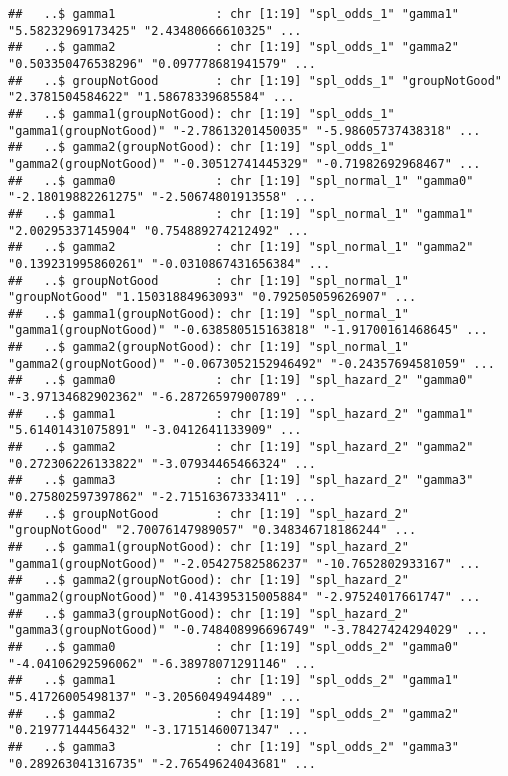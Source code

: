 \documentclass[
]{article}
\begin{document}
\begin{verbatim}
##   ..$ gamma1              : chr [1:19] "spl_odds_1" "gamma1" "5.58232969173425" "2.43480666610325" ...
##   ..$ gamma2              : chr [1:19] "spl_odds_1" "gamma2" "0.503350476538296" "0.097778681941579" ...
##   ..$ groupNotGood        : chr [1:19] "spl_odds_1" "groupNotGood" "2.3781504584622" "1.58678339685584" ...
##   ..$ gamma1(groupNotGood): chr [1:19] "spl_odds_1" "gamma1(groupNotGood)" "-2.78613201450035" "-5.98605737438318" ...
##   ..$ gamma2(groupNotGood): chr [1:19] "spl_odds_1" "gamma2(groupNotGood)" "-0.30512741445329" "-0.71982692968467" ...
##   ..$ gamma0              : chr [1:19] "spl_normal_1" "gamma0" "-2.18019882261275" "-2.50674801913558" ...
##   ..$ gamma1              : chr [1:19] "spl_normal_1" "gamma1" "2.00295337145904" "0.754889274212492" ...
##   ..$ gamma2              : chr [1:19] "spl_normal_1" "gamma2" "0.139231995860261" "-0.0310867431656384" ...
##   ..$ groupNotGood        : chr [1:19] "spl_normal_1" "groupNotGood" "1.15031884963093" "0.792505059626907" ...
##   ..$ gamma1(groupNotGood): chr [1:19] "spl_normal_1" "gamma1(groupNotGood)" "-0.638580515163818" "-1.91700161468645" ...
##   ..$ gamma2(groupNotGood): chr [1:19] "spl_normal_1" "gamma2(groupNotGood)" "-0.0673052152946492" "-0.24357694581059" ...
##   ..$ gamma0              : chr [1:19] "spl_hazard_2" "gamma0" "-3.97134682902362" "-6.28726597900789" ...
##   ..$ gamma1              : chr [1:19] "spl_hazard_2" "gamma1" "5.61401431075891" "-3.0412641133909" ...
##   ..$ gamma2              : chr [1:19] "spl_hazard_2" "gamma2" "0.272306226133822" "-3.07934465466324" ...
##   ..$ gamma3              : chr [1:19] "spl_hazard_2" "gamma3" "0.275802597397862" "-2.71516367333411" ...
##   ..$ groupNotGood        : chr [1:19] "spl_hazard_2" "groupNotGood" "2.70076147989057" "0.348346718186244" ...
##   ..$ gamma1(groupNotGood): chr [1:19] "spl_hazard_2" "gamma1(groupNotGood)" "-2.05427582586237" "-10.7652802933167" ...
##   ..$ gamma2(groupNotGood): chr [1:19] "spl_hazard_2" "gamma2(groupNotGood)" "0.414395315005884" "-2.97524017661747" ...
##   ..$ gamma3(groupNotGood): chr [1:19] "spl_hazard_2" "gamma3(groupNotGood)" "-0.748408996696749" "-3.78427424294029" ...
##   ..$ gamma0              : chr [1:19] "spl_odds_2" "gamma0" "-4.04106292596062" "-6.38978071291146" ...
##   ..$ gamma1              : chr [1:19] "spl_odds_2" "gamma1" "5.41726005498137" "-3.2056049494489" ...
##   ..$ gamma2              : chr [1:19] "spl_odds_2" "gamma2" "0.21977144456432" "-3.17151460071347" ...
##   ..$ gamma3              : chr [1:19] "spl_odds_2" "gamma3" "0.289263041316735" "-2.76549624043681" ...

\end{verbatim}
\end{document}
